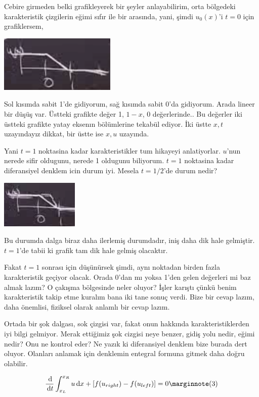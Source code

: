 \documentclass[12pt,fleqn]{article}\usepackage{../../common}
\begin{document}
Cebire girmeden belki grafikleyerek bir şeyler anlayabilirim, orta bölgedeki
karakteristik çizgilerin eğimi sıfır ile bir arasında, yani, şimdi $u_0(x)$'i
$t=0$ için grafiklersem,

\includegraphics[width=15em]{compscieng_2_08_02.png}

Sol kısımda sabit 1'de gidiyorum, sağ kısımda sabit 0'da gidiyorum. Arada
lineer bir düşüş var. Üstteki grafikte değer 1, $1-x$, 0 değerlerinde..
Bu değerler iki üstteki grafikte yatay eksenın bölümlerine tekabül ediyor.
İki üstte $x,t$ uzayındayız dikkat, bir üstte ise $x,u$ uzayında.

Yani $t=1$ noktasina kadar karakteristikler tum hikayeyi anlatiyorlar.  $u$'nun
nerede sifir oldugunu, nerede 1 oldugunu biliyorum. $t=1$ noktasina kadar
diferansiyel denklem icin durum iyi. Mesela $t=1/2$'de durum nedir? 

\includegraphics[width=10em]{compscieng_2_08_03.png}

Bu durumda dalga biraz daha ilerlemiş durumdadır, iniş daha dik hale gelmiştir.
$t=1$'de tabii ki grafik tam dik hale gelmiş olacaktır.

Fakat $t=1$ sonrası için düşünürsek şimdi, aynı noktadan birden fazla
karakteristik geçiyor olacak. Orada 0'dan mı yoksa 1'den gelen değerleri mi baz
almak lazım? O çakışma bölgesinde neler oluyor? İşler karıştı çünkü benim
karakteristik takip etme kuralım bana iki tane sonuç verdi. Bize bir cevap
lazım, daha önemlisi, fiziksel olarak anlamlı bir cevap lazım.

Ortada bir şok dalgası, sok çizgisi var, fakat onun hakkında karakteristiklerden
iyi bilgi gelmiyor. Merak ettiğimiz şok cizgisi neye benzer, gidiş yolu nedir,
eğimi nedir? Onu ne kontrol eder? Ne yazık ki diferansiyel denklem bize burada
dert oluyor. Olanları anlamak için denklemin entegral formuna gitmek daha doğru
olabilir.

$$
\frac{\ud}{\ud t} \int_{x_L}^{x_R}
u \ud x + \left[ f(u_{right}) - f(u_{left})  \right] = 0
\mlabel{3}
$$
\end{document}
